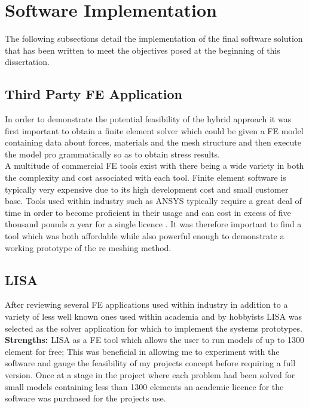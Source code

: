 
\section{Software Implementation}
The following subsections detail the implementation of the final software solution that has been written to meet the objectives posed at the beginning of this dissertation.

\subsection{Third Party FE Application}
In order to demonstrate the potential feasibility of the hybrid approach it was first important to obtain a finite element solver which could be given a FE model containing data about forces, materials and the mesh structure and then execute the model pro grammatically so as to obtain stress results. \\ 

\noindent
A multitude of commercial FE tools exist with there being a wide variety in both the complexity and cost associated with each tool. 
Finite element software is typically very expensive due to its high development cost and small customer base. Tools used within industry such as ANSYS typically require a great deal of time in order to become proficient in their usage and can cost in excess of five thousand pounds a year for a single licence \cite{AnsysCost}. It was therefore important to find a tool which was both affordable while also powerful enough to demonstrate a working prototype of the re meshing method.
 
\subsection{LISA}
After reviewing several FE applications used within industry in addition to a variety of less well known ones used within academia and by hobbyists LISA  was selected as the solver application for which to implement  the systems prototypes. \\ 

\noindent
\textbf{Strengths: }LISA as a FE tool which allows the user to run models of up to 1300 element for free; This was beneficial in allowing me to experiment with the software and gauge the feasibility of my projects concept before requiring a full version. Once at a stage in the project where each problem had been solved for small models containing less than 1300 elements an academic licence for the software was purchased for the projects use. \\

